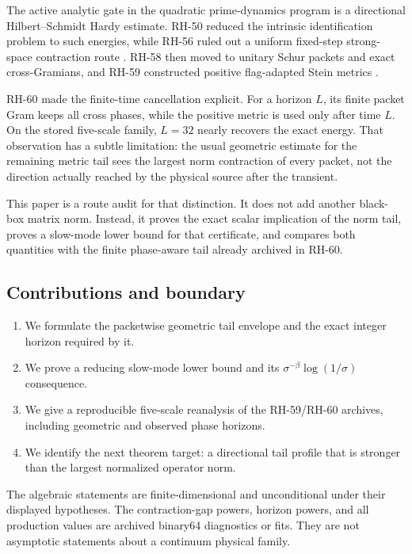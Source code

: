\documentclass[11pt]{article}
\theoremstyle{remark}
\begin{document}
The active analytic gate in the quadratic prime-dynamics program is a
directional Hilbert--Schmidt Hardy estimate.  RH-50 reduced the intrinsic
identification problem to such energies, while RH-56 ruled out a uniform
fixed-step strong-space contraction route
\citep{WangHardy2026,WangHardyBarrier2026}.  RH-58 then moved to unitary
Schur packets and exact cross-Gramians, and RH-59 constructed positive
flag-adapted Stein metrics
\citep{WangSchurGram2026,WangFlagMetric2026}.

RH-60 made the finite-time cancellation explicit.  For a horizon $L$, its
finite packet Gram keeps all cross phases, while the positive metric is used
only after time $L$.  On the stored five-scale family, $L=32$ nearly recovers
the exact energy.  That observation has a subtle limitation: the usual
geometric estimate for the remaining metric tail sees the largest norm
contraction of every packet, not the direction actually reached by the
physical source after the transient.

This paper is a route audit for that distinction.  It does not add another
black-box matrix norm.  Instead, it proves the exact scalar implication of
the norm tail, proves a slow-mode lower bound for that certificate, and
compares both quantities with the finite phase-aware tail already archived
in RH-60.

\subsection*{Contributions and boundary}

\begin{enumerate}[leftmargin=2.2em]
 \item We formulate the packetwise geometric tail envelope and the exact
       integer horizon required by it.
 \item We prove a reducing slow-mode lower bound and its
       $\sigma^{-\beta}\log(1/\sigma)$ consequence.
 \item We give a reproducible five-scale reanalysis of the RH-59/RH-60
       archives, including geometric and observed phase horizons.
 \item We identify the next theorem target: a directional tail profile that
       is stronger than the largest normalized operator norm.
\end{enumerate}

The algebraic statements are finite-dimensional and unconditional under
their displayed hypotheses.  The contraction-gap powers, horizon powers,
and all production values are archived binary64 diagnostics or fits.  They
are not asymptotic statements about a continuum physical family.
\end{document}
